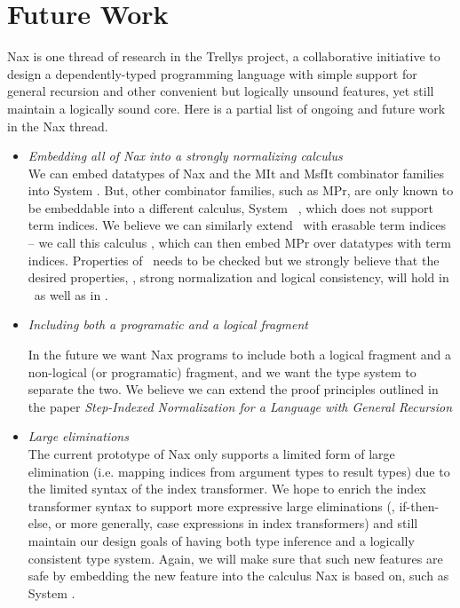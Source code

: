 \section{Future Work}


Nax is one thread of research in the Trellys project,
a collaborative initiative to design a
dependently-typed programming language with simple support for general recursion
and other convenient but logically unsound features, yet still maintain a
logically sound core. Here is a partial list of ongoing and future work in the Nax thread.

\begin{itemize}

\item \emph{Embedding all of Nax into a strongly normalizing calculus}\\
We can embed datatypes of Nax and the \textsf{MIt} and \textsf{MsfIt}
combinator families into System \Fi. But, other combinator families,
such as \textsf{MPr}, are only known to be embeddable into a different
calculus, System \Fixw\ \cite{AbeMat04}, which does not support term indices.
We believe we can similarly extend \Fixw\ with erasable term indices -- we call this
calculus \Fixi, which can then embed \textsf{MPr} over datatypes with term indices.
Properties of \Fixi\ needs to be checked but we strongly believe
that the desired properties, \ie, strong normalization
and logical consistency, will hold in \Fixi\ as well as in \Fi.

\item \emph{Including both a programatic and a logical fragment}

In the future we want Nax programs to include both a logical fragment
and a non-logical (or programatic) fragment, and we want the type system
to separate the two. We believe we can extend the proof principles
outlined in the paper
{\em Step-Indexed Normalization for a Language with General Recursion}\cite{ccasin:msfp12}


	
\item \emph{Large eliminations}\\
	The current prototype of Nax only supports a limited
	form of large elimination (i.e. mapping indices from
	argument types to result types) due to the limited syntax
	of the index transformer. We hope to enrich the index
	transformer syntax to support more expressive large eliminations
	(\eg, if-then-else, or more generally, case expressions
	in index transformers) and still maintain our design goals of
	having both type inference and a logically consistent type system.
	Again, we will make sure that such new features are safe by embedding
	the new feature into the calculus Nax is based on, such as System \Fi.


\end{itemize}

